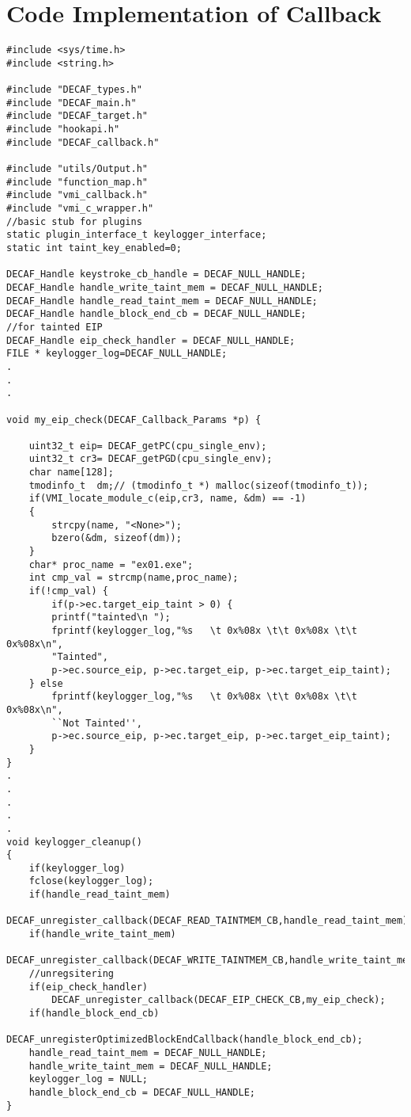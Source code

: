 \documentclass[a4paper, 11pt]{article}
\begin{document}
\newpage
\section*{Code Implementation of Callback}
\begin{lstlisting}
#include <sys/time.h>
#include <string.h>

#include "DECAF_types.h"
#include "DECAF_main.h"
#include "DECAF_target.h"
#include "hookapi.h"
#include "DECAF_callback.h"

#include "utils/Output.h"
#include "function_map.h"
#include "vmi_callback.h"
#include "vmi_c_wrapper.h"
//basic stub for plugins
static plugin_interface_t keylogger_interface;
static int taint_key_enabled=0;

DECAF_Handle keystroke_cb_handle = DECAF_NULL_HANDLE;
DECAF_Handle handle_write_taint_mem = DECAF_NULL_HANDLE;
DECAF_Handle handle_read_taint_mem = DECAF_NULL_HANDLE;
DECAF_Handle handle_block_end_cb = DECAF_NULL_HANDLE;
//for tainted EIP
DECAF_Handle eip_check_handler = DECAF_NULL_HANDLE;
FILE * keylogger_log=DECAF_NULL_HANDLE;
.
.
.

void my_eip_check(DECAF_Callback_Params *p) {
    
    uint32_t eip= DECAF_getPC(cpu_single_env);
    uint32_t cr3= DECAF_getPGD(cpu_single_env);
    char name[128];
    tmodinfo_t  dm;// (tmodinfo_t *) malloc(sizeof(tmodinfo_t));
    if(VMI_locate_module_c(eip,cr3, name, &dm) == -1)
    {
        strcpy(name, "<None>");
        bzero(&dm, sizeof(dm));
    }
    char* proc_name = "ex01.exe";
    int cmp_val = strcmp(name,proc_name);
    if(!cmp_val) {
        if(p->ec.target_eip_taint > 0) {
        printf("tainted\n ");
        fprintf(keylogger_log,"%s   \t 0x%08x \t\t 0x%08x \t\t 0x%08x\n", 
        "Tainted", 
        p->ec.source_eip, p->ec.target_eip, p->ec.target_eip_taint);
    } else
        fprintf(keylogger_log,"%s   \t 0x%08x \t\t 0x%08x \t\t 0x%08x\n",
        ``Not Tainted'', 
        p->ec.source_eip, p->ec.target_eip, p->ec.target_eip_taint);
    }
}
.
.
.
.
.
void keylogger_cleanup()
{
    if(keylogger_log)
    fclose(keylogger_log);
    if(handle_read_taint_mem)
        DECAF_unregister_callback(DECAF_READ_TAINTMEM_CB,handle_read_taint_mem);
    if(handle_write_taint_mem)
        DECAF_unregister_callback(DECAF_WRITE_TAINTMEM_CB,handle_write_taint_mem);
    //unregsitering        
    if(eip_check_handler)
        DECAF_unregister_callback(DECAF_EIP_CHECK_CB,my_eip_check);
    if(handle_block_end_cb)
        DECAF_unregisterOptimizedBlockEndCallback(handle_block_end_cb);
    handle_read_taint_mem = DECAF_NULL_HANDLE;
    handle_write_taint_mem = DECAF_NULL_HANDLE;
    keylogger_log = NULL;
    handle_block_end_cb = DECAF_NULL_HANDLE;
}


\end{lstlisting}
\end{document}
